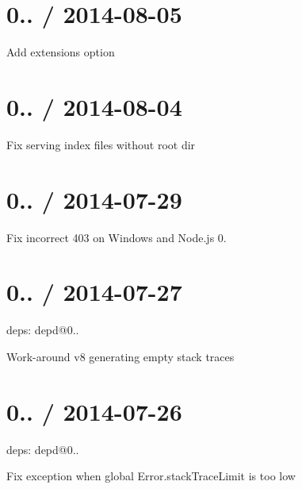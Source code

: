 \section*{0.. / 2014-\/08-\/05 }


\begin{DoxyItemize}
\item Add {\ttfamily extensions} option
\end{DoxyItemize}

\section*{0.. / 2014-\/08-\/04 }


\begin{DoxyItemize}
\item Fix serving index files without root dir
\end{DoxyItemize}

\section*{0.. / 2014-\/07-\/29 }


\begin{DoxyItemize}
\item Fix incorrect 403 on Windows and Node.\+js 0.
\end{DoxyItemize}

\section*{0.. / 2014-\/07-\/27 }


\begin{DoxyItemize}
\item deps\+: depd@0..
\begin{DoxyItemize}
\item Work-\/around v8 generating empty stack traces
\end{DoxyItemize}
\end{DoxyItemize}

\section*{0.. / 2014-\/07-\/26 }


\begin{DoxyItemize}
\item deps\+: depd@0..
\begin{DoxyItemize}
\item Fix exception when global {\ttfamily Error.\+stack\+Trace\+Limit} is too low
\end{DoxyItemize}
\end{DoxyItemize}

